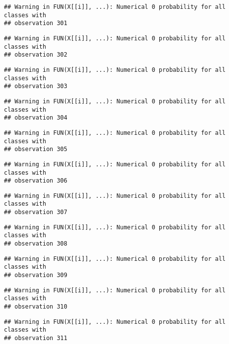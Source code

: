 \documentclass[
]{article}
\begin{document}
\begin{verbatim}
## Warning in FUN(X[[i]], ...): Numerical 0 probability for all classes with
## observation 301
\end{verbatim}

\begin{verbatim}
## Warning in FUN(X[[i]], ...): Numerical 0 probability for all classes with
## observation 302
\end{verbatim}

\begin{verbatim}
## Warning in FUN(X[[i]], ...): Numerical 0 probability for all classes with
## observation 303
\end{verbatim}

\begin{verbatim}
## Warning in FUN(X[[i]], ...): Numerical 0 probability for all classes with
## observation 304
\end{verbatim}

\begin{verbatim}
## Warning in FUN(X[[i]], ...): Numerical 0 probability for all classes with
## observation 305
\end{verbatim}

\begin{verbatim}
## Warning in FUN(X[[i]], ...): Numerical 0 probability for all classes with
## observation 306
\end{verbatim}

\begin{verbatim}
## Warning in FUN(X[[i]], ...): Numerical 0 probability for all classes with
## observation 307
\end{verbatim}

\begin{verbatim}
## Warning in FUN(X[[i]], ...): Numerical 0 probability for all classes with
## observation 308
\end{verbatim}

\begin{verbatim}
## Warning in FUN(X[[i]], ...): Numerical 0 probability for all classes with
## observation 309
\end{verbatim}

\begin{verbatim}
## Warning in FUN(X[[i]], ...): Numerical 0 probability for all classes with
## observation 310
\end{verbatim}

\begin{verbatim}
## Warning in FUN(X[[i]], ...): Numerical 0 probability for all classes with
## observation 311
\end{verbatim}
\end{document}
